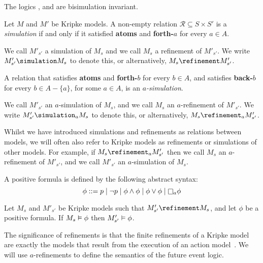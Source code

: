 \begin{lemma}
The logics \logicK{}, \logicKD{} and \logicS{} are bisimulation invariant.
\end{lemma}


\begin{definition}
Let $M$ and $M'$ be Kripke models. A non-empty relation $\mathcal{R}
\subseteq S \times S'$ is a \textit{simulation} if and only if it satisfied {\bf
atoms} and {\bf forth-$a$} for every $a \in A$.

We call $M'_{s'}$ a simulation of $M_s$ and we call $M_s$ a refinement of
$M'_{s'}$. We write $M'_{s'} \simulation M_s$ to denote this, or alternatively,
$M_s \refinement M'_{s'}$.

A relation that satisfies {\bf atoms} and {\bf forth-$b$} for every $b \in A$,
and satisfies {\bf back-$b$} for every $b \in A - \{a\}$, for some $a \in A$, is
an $a$\textit{-simulation}. 

We call $M'_{s'}$ an $a$-simulation of $M_s$, and we call $M_s$ an
$a$-refinement of $M'_{s'}$. We write $M'_{s'} \simulation_a M_s$ to denote
this, or alternatively, $M_s \refinement_a M'_{s'}$.
\end{definition}

Whilst we have introduced simulations and refinements as relations between
models, we will often also refer to Kripke models as refinements or simulations
of other models. For example, if $M_s \refinement_a M'_{s'}$ then we call $M_s$
an $a$-refinement of $M'_{s'}$, and we call $M'_{s'}$ an $a$-simulation of
$M_s$.

\begin{definition}
A positive formula is defined by the following abstract syntax:
$$
\phi ::=    p \bnfalt 
            \neg p \bnfalt
            \phi \land \phi \bnfalt
            \phi \lor \phi \bnfalt
            \knows_a \phi
$$
\end{definition}

\begin{lemma}
Let $M_s$ and $M'_{s'}$ be Kripke models such that $M'_{s'} \refinement M_s$,
and let $\phi$ be a positive formula. If $M_s \vDash \phi$ then $M'_{s'}
\vDash \phi$.
\end{lemma}


The significance of refinements is that the finite refinements of a Kripke model
are exactly the models that result from the execution of an action
model~\cite{french2009simulation}. We will use $a$-refinements to define the
semantics of the future event logic.
